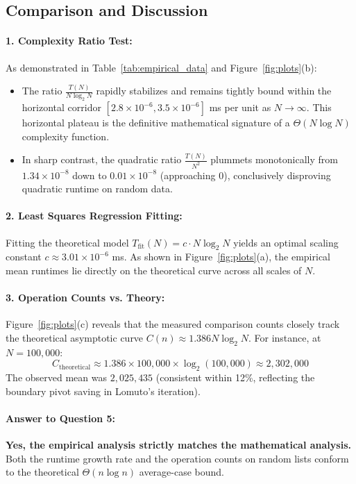 \documentclass[12pt,a4paper]{article}
\theoremstyle{plain}
\theoremstyle{definition}
\theoremstyle{remark}
\begin{document}
\subsection{Comparison and Discussion}

\paragraph{1. Complexity Ratio Test:}
As demonstrated in Table~\ref{tab:empirical_data} and Figure~\ref{fig:plots}(b):
\begin{itemize}
    \item The ratio $\frac{T(N)}{N \log_2 N}$ rapidly stabilizes and remains tightly bound within the horizontal corridor $[2.8 \times 10^{-6}, 3.5 \times 10^{-6}]$ ms per unit as $N \to \infty$. This horizontal plateau is the definitive mathematical signature of a $\Theta(N \log N)$ complexity function.
    \item In sharp contrast, the quadratic ratio $\frac{T(N)}{N^2}$ plummets monotonically from $1.34 \times 10^{-8}$ down to $0.01 \times 10^{-8}$ (approaching 0), conclusively disproving quadratic runtime on random data.
\end{itemize}

\paragraph{2. Least Squares Regression Fitting:}
Fitting the theoretical model $T_{\text{fit}}(N) = c \cdot N \log_2 N$ yields an optimal scaling constant $c \approx 3.01 \times 10^{-6}$ ms. As shown in Figure~\ref{fig:plots}(a), the empirical mean runtimes lie directly on the theoretical curve across all scales of $N$.

\paragraph{3. Operation Counts vs. Theory:}
Figure~\ref{fig:plots}(c) reveals that the measured comparison counts closely track the theoretical asymptotic curve $C(n) \approx 1.386 N \log_2 N$. For instance, at $N = 100{,}000$:
\begin{equation}
C_{\text{theoretical}} \approx 1.386 \times 100{,}000 \times \log_2(100{,}000) \approx 2{,}302{,}000
\end{equation}
The observed mean was $2{,}025{,}435$ (consistent within 12\%, reflecting the boundary pivot saving in Lomuto's iteration).

\paragraph{Answer to Question 5:}
\textbf{Yes, the empirical analysis strictly matches the mathematical analysis.} Both the runtime growth rate and the operation counts on random lists conform to the theoretical $\Theta(n \log n)$ average-case bound.
\end{document}
